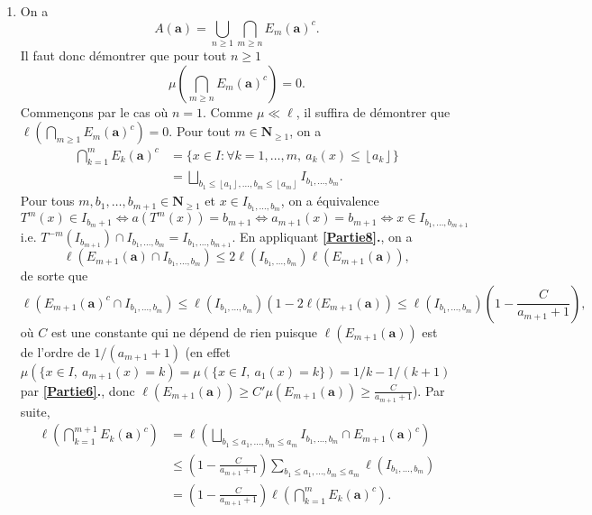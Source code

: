 \documentclass[french]{article}
\theoremstyle{definition}
\newcommand{\tuple}[1]{\left(#1\right)}
\newcommand{\floor}[1]{\left\lfloor#1\right\rfloor}
\newcommand{\Nbb}{\mathbf{N}}
\newcommand{\abf}{\mathbf{a}}
\begin{document}
\begin{enumerate}
\begin{enumerate}
            \item \label{Partie13b} On a
                $$A(\abf) = \bigcup_{n \ge 1}\bigcap_{m \ge n}E_m(\abf)^c.$$
            Il faut donc d\'emontrer que pour tout $n \ge 1$
                $$\mu\tuple{\bigcap_{m \ge n} E_m(\abf)^c} = 0.$$
            Commen\c cons par le cas o\`u $n = 1$. Comme $\mu \ll \ell$, il suffira de d\'emontrer que $\ell\tuple{\bigcap_{m \ge 1} E_m(\abf)^c} = 0$. Pour tout $m \in \Nbb_{\ge 1}$, on a
                \begin{align*}
                    \bigcap_{k = 1}^m E_k(\abf)^c & = \{x \in I: \forall k = 1,\ldots,m, \ a_k(x) \le \floor{a_k}\} \\
                    & = \bigsqcup_{b_1 \le \floor{a_1}, \ldots,b_m \le \floor{a_m}} I_{b_1,\ldots,b_m}.
                \end{align*}
            Pour tous $m, b_1,\ldots,b_{m+1} \in \Nbb_{\ge 1}$ et $x \in I_{b_1,\ldots,b_m}$, on a \'equivalence
                $$T^m(x) \in I_{b_m+1} \Leftrightarrow a(T^m(x)) = b_{m+1} \Leftrightarrow a_{m+1}(x) = b_{m+1} \Leftrightarrow x \in I_{b_1,\ldots,b_{m+1}}$$
            i.e. $T^{-m}(I_{b_{m+1}}) \cap I_{b_1,\ldots,b_m} = I_{b_1,\ldots,b_{m+1}}$. En appliquant {\bf \ref{Partie8}.}, on a
                $$\ell\left(E_{m+1}(\abf) \cap I_{b_1,\dots,b_m}\right) \leq 2 \ell(I_{b_1, \dots, b_m}) \ell\left(E_{m+1}(\abf)\right),$$
                de sorte que
                $$
                \ell(E_{m+1}(\abf)^c \cap I_{b_1, \dots, b_m}) \leq \ell(I_{b_1, \dots, b_m})\left(1 - 2\ell(E_{m+1}(\abf)\right) \leq \ell(I_{b_1, \dots, b_m}) \left(1 - \frac{C}{a_{m+1} +1}\right),
                $$
                o\`u $C$ est une constante qui ne d\'epend de rien puisque $\ell(E_{m+1}(\abf))$ est de l'ordre de $1/(a_{m+1} +1)$ (en effet $\mu(\{x \in I,~a_{m+1}(x) = k) = \mu(\{x \in I,~a_{1}(x) = k\}) =  1/k - 1/({k} + 1)$ par \textbf{\ref{Partie6}.}, donc $\ell(E_{m+1}(\abf)) \geq C' \mu(E_{m+1}(\abf)) \geq \displaystyle{\frac{C}{a_{m+1} +1}}$). Par suite,
                $$
                \begin{aligned}
                \ell\tuple{\bigcap_{k = 1}^{m+1} E_k(\abf)^c} &=\ell\left( \bigsqcup_{b_1 \leq a_1, \dots, b_m \leq a_m} I_{b_1, \dots, b_m} \cap E_{m+1}(\abf)^{c}\right) \\
                &\leq \left(1 - \frac{C}{a_{m+1} +1}\right) \sum_{b_1 \leq a_1, \dots, b_m \leq a_m} \ell(I_{b_1,\dots,b_m}) \\
                &= \left(1 - \frac{C}{a_{m+1} +1}\right) \ell\tuple{\bigcap_{k = 1}^{m} E_k(\abf)^c}.

\end{aligned}$$
\end{enumerate}
\end{enumerate}
\end{document}
